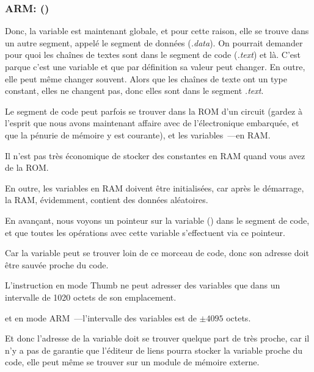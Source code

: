 \subsubsection{ARM: \OptimizingKeilVI (\ThumbMode)}



Donc, la variable  est maintenant globale, et pour cette raison, elle se trouve
dans un autre segment, appelé le segment de données (\emph{.data}).
On pourrait demander pour quoi les chaînes de textes sont dans le segment de code
(\emph{.text}) et  là.
C'est parque c'est une variable et que par définition sa valeur peut changer. En
outre, elle peut même changer souvent.
Alors que les chaînes de texte ont un type constant, elles ne changent pas, donc
elles sont dans le segment \emph{.text}.
\myindex{\RAM}
\myindex{\ROM}

Le segment de code peut parfois se trouver dans la \ac{ROM} d'un circuit (gardez
à l'esprit que nous avons maintenant affaire avec de l'électronique embarquée, et
que la pénurie de mémoire y est courante), et les variables~---en \ac{RAM}.

Il n'est pas très économique de stocker des constantes en RAM quand vous avez de
la ROM.

En outre, les variables en RAM doivent être initialisées, car après le démarrage,
la RAM, évidemment, contient des données aléatoires.


En avançant, nous voyons un pointeur sur la variable  () dans
le segment de code, et que toutes les opérations avec cette variable s'effectuent
via ce pointeur.

Car la variable  peut se trouver loin de ce morceau de code, donc son adresse
doit être sauvée proche du code.

L'instruction  en mode Thumb ne peut adresser des variables que dans un
intervalle de 1020 octets de son emplacement.

et en mode ARM~---l'intervalle des variables est de $\pm{}4095$ octets.

Et donc l'adresse de la variable  doit se trouver quelque part de très proche,
car il n'y a pas de garantie que l'éditeur de liens pourra stocker la variable proche
du code, elle peut même se trouver sur un module de mémoire externe.

\myindex{\ROM}

